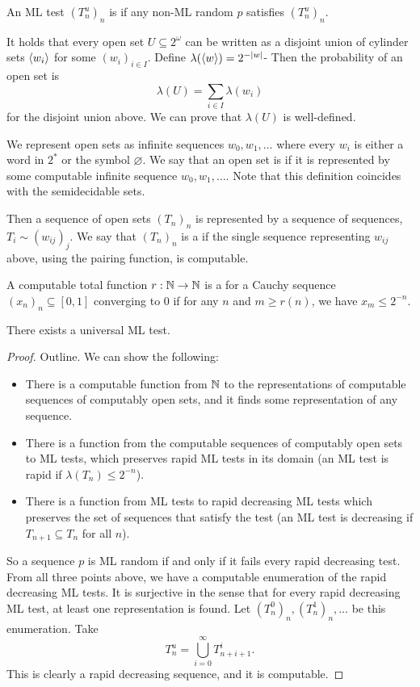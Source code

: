\begin{definition}
  An ML test $(T_n^u)_n$ is  if any non-ML random $p$ satisfies
  $(T_n^u)_n$.
\end{definition}

It holds that every open set $U \subseteq 2^\omega$ can be written as a disjoint
union of cylinder sets $\left< w_i \right>$ for some $(w_i)_{i \in I}$.
Define $\lambda(\left< w \right>) = 2^{-\left| w \right|}$-
Then the probability of an open set is
\[
  \lambda(U) = \sum_{i \in I} \lambda(w_i)
\]
for the disjoint union above.
We can prove that $\lambda(U)$ is well-defined.

We represent open sets as infinite sequences $w_0, w_1, \ldots$ where every
$w_i$ is either a word in $2^*$ or the symbol $\varnothing$.
We say that an open set is  if it is represented by some
computable infinite sequence $w_0, w_1, \ldots$.
Note that this definition coincides with the semidecidable sets.

Then a sequence of open sets $(T_n)_n$ is represented by a sequence of
sequences, $T_i \sim (w_{ij})_j$.
We say that $(T_n)_n$ is a  if
the single sequence representing $w_{ij}$ above, using the pairing function, is
computable.

A computable total function $r: \mathbb{N} \to \mathbb{N}$ is a  for a Cauchy sequence $(x_n)_n \subseteq [0,1]$ converging to $0$
if for any $n$ and $m \ge r(n)$, we have $x_m \le 2^{-n}$.

\begin{theorem}
  There exists a universal ML test.
\end{theorem}

\begin{proof}
  Outline.
  We can show the following:
  \begin{itemize}
  \item There is a computable function from $\mathbb{N}$ to the representations of
	computable sequences of computably open sets, and it finds some
	representation of any sequence.
  \item There is a function from the computable sequences of computably open
	sets to ML tests, which preserves rapid ML tests in its domain
	(an ML test is rapid if $\lambda(T_n) \le 2^{-n}$).
  \item There is a function from ML tests to rapid decreasing ML tests which
	preserves the set of sequences that satisfy the test
	(an ML test is decreasing if $T_{n+1} \subseteq T_n$ for all $n$).
  \end{itemize}
  So a sequence $p$ is ML random if and only if it fails every rapid decreasing
  test.
  From all three points above, we have a computable enumeration of the rapid
  decreasing ML tests.
  It is surjective in the sense that for every rapid decreasing ML test, at
  least one representation is found.
  Let $(T_n^0)_n, (T_n^1)_n, \ldots$ be this enumeration.
  Take
  \[
	T_n^u = \bigcup_{i=0}^\infty T_{n+i+1}^i.
  \]
  This is clearly a rapid decreasing sequence, and it is computable.
\end{proof}

